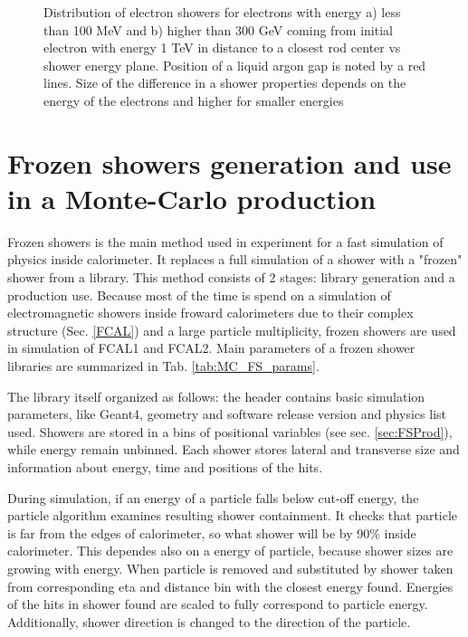 \begin{figure}[!tbp]
\begin{minipage}[h]{0.49\linewidth}
\end{minipage}
\hfill
\begin{minipage}[h]{0.49\linewidth}
\end{minipage}
\caption{Distribution of electron showers for electrons with energy a) less than 100 MeV  and b) higher than 300 GeV coming from initial electron with energy 1 TeV in distance to a closest rod center vs shower energy plane. Position of a liquid argon gap is noted by a red lines. Size of the difference in a shower properties depends on the energy of the electrons and higher for smaller energies}
\label{fig:FSProduction2}
\end{figure}

\section{Frozen showers generation and use in a Monte-Carlo production}

Frozen showers is the main method used in \atlas experiment for a fast simulation of physics inside calorimeter. It replaces a full simulation of a shower with a "frozen" shower from a library. This method consists of 2 stages: library generation and a production use. Because most of the time is spend on a simulation of electromagnetic showers inside froward calorimeters due to their complex structure (Sec. \ref{FCAL}) and a large particle multiplicity, frozen showers are used in simulation of FCAL1 and FCAL2. Main parameters of a frozen shower libraries are summarized in Tab. \ref{tab:MC_FS_params}.


 The library itself organized as follows: the header contains basic simulation parameters, like Geant4, geometry and \atlas software release version and physics list used. Showers are stored in a bins of positional  variables (see sec. \ref{sec:FSProd}), while energy remain unbinned. Each shower stores lateral and transverse size and information about energy, time and positions of the hits.
 
During simulation, if an energy of a particle falls below cut-off energy, the particle algorithm examines resulting shower containment. It checks  that particle is far from the edges of calorimeter, so what shower will be by 90\% inside calorimeter. This dependes also on a energy of particle, because shower sizes are growing with energy.
When particle is removed and substituted by shower taken from corresponding eta and distance bin with the closest energy found. Energies of the hits in shower found are scaled to fully correspond to particle energy. Additionally, shower direction is changed to the direction of the particle.

